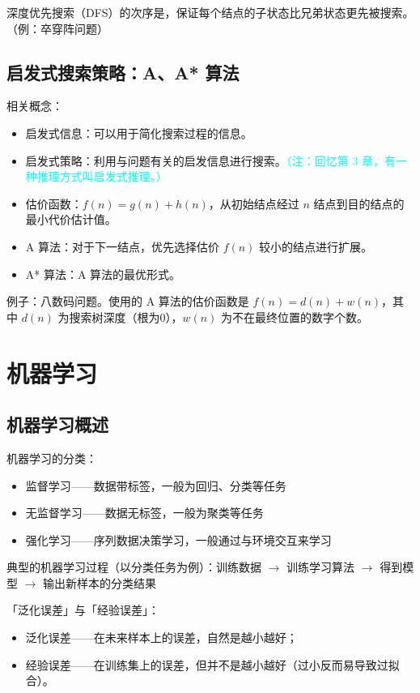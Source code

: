 \documentclass[UTF8]{ctexart}
\newcommand\Emph[1]{\colorbox{green!10}{\textcolor{green!30!black}{#1}}}
\begin{document}
深度优先搜索（DFS）的次序是，保证每个结点的子状态比兄弟状态更先被搜索。（例：卒穿阵问题）

\subsection{启发式搜索策略：A、A* 算法}
相关概念：

\begin{itemize}[itemsep=0pt,parsep=0pt]
  \item 启发式信息：可以用于简化搜索过程的信息。
  \item 启发式策略：利用与问题有关的启发信息进行搜索。\textcolor{cyan}{（注：回忆第 3 章，有一种推理方式叫启发式推理。）}
  \item 估价函数：$f(n) = g(n)+h(n)$，从初始结点经过 $n$ 结点到目的结点的最小代价估计值。
  \item A 算法：对于下一结点，优先选择估价 $f(n)$ 较小的结点进行扩展。
  \item A* 算法：A 算法的最优形式。
\end{itemize}

例子：八数码问题。使用的 A 算法的估价函数是 $f(n) = d(n) + w(n)$，其中 $d(n)$ 为搜索树深度（根为0），$w(n)$ 为不在最终位置的数字个数。

\section{机器学习}
\subsection{机器学习概述}
\noindent\Emph{机器学习的分类}：
\begin{itemize}[itemsep=0pt,parsep=0pt]
  \item 监督学习——数据带标签，一般为回归、分类等任务
  \item 无监督学习——数据无标签，一般为聚类等任务
  \item 强化学习——序列数据决策学习，一般通过与环境交互来学习
\end{itemize}

\noindent 典型的机器学习过程（以分类任务为例）：训练数据 $\to$ 训练学习算法 $\to$ 得到模型 $\to$ 输出新样本的分类结果

\noindent 「泛化误差」与「经验误差」：
\begin{itemize}[itemsep=0pt,parsep=0pt]
  \item 泛化误差——在未来样本上的误差，自然是越小越好；
  \item 经验误差——在训练集上的误差，但并不是越小越好（过小反而易导致过拟合）。
\end{itemize}
\end{document}
